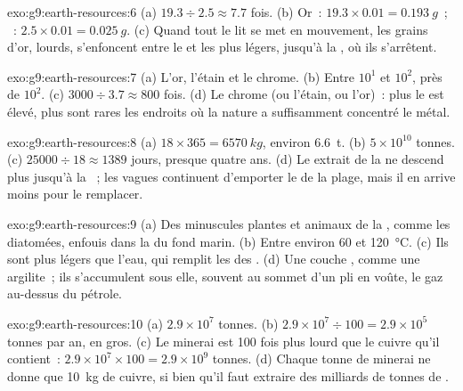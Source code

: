 \begin{solution}{exo:g9:earth-resources:6}
(a) $19.3 \div 2.5 \approx 7.7$ fois. (b) Or~: $19.3 \times 0.01 =
\qty{0.193}{g}$~; ~: $2.5 \times 0.01 = \qty{0.025}{g}$. (c) Quand
tout le lit se met en mouvement, les grains d'or, lourds, s'enfoncent entre
le  et les  plus légers, jusqu'à la , où ils
s'arrêtent.
\end{solution}

\begin{solution}{exo:g9:earth-resources:7}
(a) L'or, l'étain et le chrome. (b) Entre $10^1$ et $10^2$, près de
$10^2$. (c) $3000 \div 3.7 \approx 800$ fois. (d) Le chrome (ou l'étain,
ou l'or)~: plus le  est élevé, plus sont rares les
endroits où la nature a suffisamment concentré le métal.
\end{solution}

\begin{solution}{exo:g9:earth-resources:8}
(a) $18 \times 365 = \qty{6570}{kg}$, environ \qty{6.6}{t}. (b) $5 \times
10^{10}$ tonnes. (c) $25000 \div 18 \approx 1389$ jours, presque quatre
ans. (d) Le  extrait de la  ne descend plus jusqu'à la ~;
les vagues continuent d'emporter le  de la plage, mais il en arrive
moins pour le remplacer.
\end{solution}

\begin{solution}{exo:g9:earth-resources:9}
(a) Des minuscules plantes et animaux de la , comme les diatomées,
enfouis dans la  du fond marin. (b) Entre environ 60 et
\qty{120}{\degreeCelsius}. (c) Ils sont plus légers que l'eau, qui remplit
les  des . (d) Une couche , comme une argilite~; ils
s'accumulent sous elle, souvent au sommet d'un pli en voûte, le gaz
au-dessus du pétrole.
\end{solution}

\begin{solution}{exo:g9:earth-resources:10}
(a) $2.9 \times 10^7$ tonnes. (b) $2.9 \times 10^7 \div 100 = 2.9 \times
10^5$ tonnes par an, en gros. (c) Le minerai est 100 fois plus lourd que le
cuivre qu'il contient~: $2.9 \times 10^7 \times 100 = 2.9 \times 10^9$
tonnes. (d) Chaque tonne de minerai ne donne que \qty{10}{kg} de cuivre,
si bien qu'il faut extraire des milliards de tonnes de .
\end{solution}

